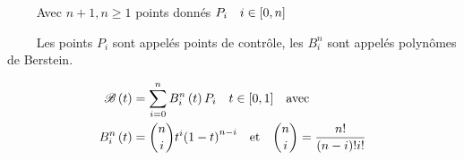 \documentclass{amsart}
\begin{document}
  \pagestyle{empty}

  \centerline{$\qquad$ Avec ${n+1}, {n} \geq 1$ points donnés ${P}_{i} \quad {i}\in\interval[scaled]{0}{n}$}

  \centerline{$\qquad$ Les points ${P}_{i}$ sont appelés points de contrôle, les ${B}_{i}^{n}$ sont appelés polynômes de Berstein.}

  \begin{equation*}
    \begin{split}
      \mathscr{B}\left({t}\right) & = \sum_{i=0}^{n} {{B}_{i}^{n}\left(t\right) {P}_{i}} \quad {t}\in\interval[scaled]{0}{1} \quad \text{avec} \\
      {B}_{i}^{n}\left({t}\right) & = \binom{n}{i}t^{i}{\left({1-t}\right)}^{n-i} \quad \text{et} \quad {\binom{n}{i} = \frac{n!}{\left(n-i\right)!i!}}
    \end{split} 
  \end{equation*}
\end{document}
